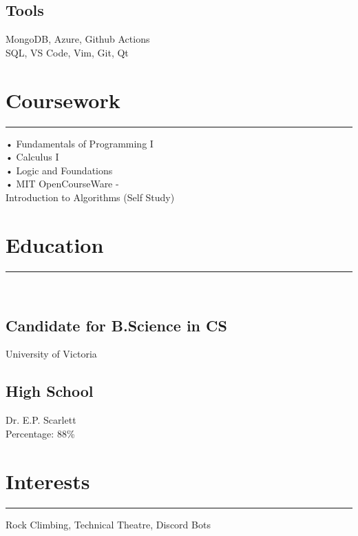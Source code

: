 \documentclass[]{resume}
\begin{document}
\begin{minipage}[t]{0.30\textwidth}
\subsection{Tools}
MongoDB, Azure, Github Actions \\ SQL, VS Code, Vim, Git, Qt
\sectionsep
\section{Coursework}
\noindent\rule{5cm}{0.4pt}

• Fundamentals of Programming I\\
• Calculus I\\
• Logic and Foundations\\
• MIT OpenCourseWare - \\Introduction to Algorithms (Self Study)
\sectionsep
\section{Education} 
\noindent\rule{5cm}{0.4pt}\\
\subsection{Candidate for B.Science in CS}
University of Victoria \\
\vspace{8pt}
\subsection{High School}
Dr. E.P. Scarlett\\
Percentage: 88\%
\section{Interests}
\noindent\rule{5cm}{0.4pt}

Rock Climbing, Technical Theatre, Discord Bots
\sectionsep
%
%

\end{minipage} 
\hfill
\end{document}

